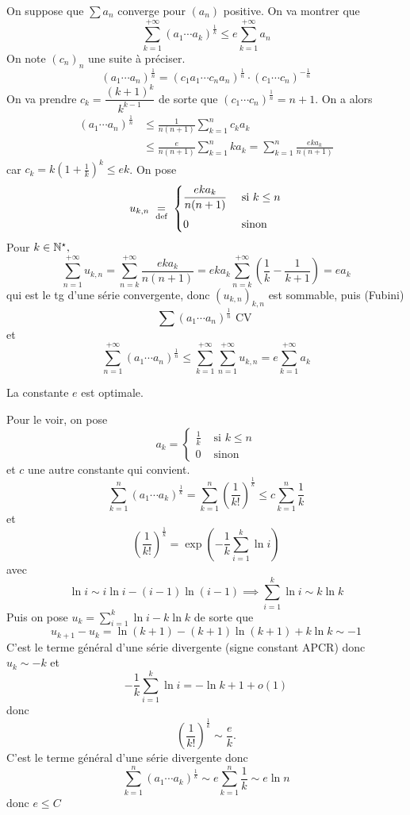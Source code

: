 On suppose que $\sum a_n$ converge pour $(a_n)$ positive. On va montrer que \[
    \sum_{k=1}^{+\infty}(a_1\cdots a_k)^{\frac1k}\leq e\sum_{k=1}^{+\infty}a_n
\]
On note $(c_n)_n$ une suite à préciser. \[
    (a_1\cdots a_n)^{\frac1n}=(c_1a_1\cdots c_na_n)^{\frac1n}\cdot (c_1\cdots c_n)^{-\frac1n}
\]
On va prendre $c_k=\dfrac{(k+1)^k}{k^{k-1}}$ de sorte que $(c_1\cdots c_n)^{\frac1n}=n+1$. On a alors \begin{align*}
    (a_1\cdots a_n)^{\frac 1n}&\leq \frac1{n(n+1)}\sum_{k=1}^nc_ka_k \tag{AM-GM}\\
                              &\leq \frac e{n(n+1)}\sum_{k=1}^nka_k=\sum_{k=1}^n\frac{eka_k}{n(n+1)}
\end{align*}
car $c_k=k \left( 1+\frac1k \right)^k\leq ek $. On pose \[
    u_{k, n}\;\underset{\text{def}}=\; \begin{cases}
        \dfrac{eka_k}{n(n+1)}&\text{ si }k\leq n\\[1em] 0 & \text{ sinon }
    \end{cases}
\]
Pour $k\in\mathbb N^\star,$ \[
    \sum_{n=1}^{+\infty}u_{k, n}=\sum_{n=k}^{+\infty}\frac{eka_k}{n(n+1)}=eka_k\sum_{n=k}^{+\infty} \left( \frac1k-\frac1{k+1} \right)=ea_k
\]
qui est le tg d'une série convergente, donc $(u_{k, n})_{k, n}$ est sommable, puis (Fubini) \[
    \sum (a_1\cdots a_n)^{\frac1n} \text{ CV }
\]
et \[
    \sum_{n=1}^{+\infty}(a_1\cdots a_n)^{\frac1n}\leq \sum_{k=1}^{+\infty}\sum_{n=1}^{+\infty}u_{k,n}=e\sum_{k=1}^{+\infty}a_k
\]

\begin{rem}
    La constante $e$ est optimale.
\end{rem}

Pour le voir, on pose \[
    a_k= \begin{cases}
        \frac1k&\text{ si }k\leq n\\ 0&\text{ sinon }
    \end{cases}
\]
et $c$ une autre constante qui convient. \[
    \sum_{k=1}^n(a_1\cdots a_k)^{\frac 1k}=\sum_{k=1}^n \left( \frac1{k!} \right)^{\frac1k}\leq c\sum_{k=1}^n\frac1k
\]
et \[
    \left( \frac1{k!} \right)^{\frac1k}=\exp \left( -\frac1k\sum_{i=1}^k\ln i \right)
\]
avec \[
    \ln i\sim i\ln i-(i-1)\ln (i-1) \implies \sum_{i=1}^k\ln i\sim k\ln k
\]
Puis on pose $\displaystyle u_k=\sum_{i=1}^k\ln i-k\ln k$ de sorte que \[
    u_{k+1}-u_k=\ln(k+1)-(k+1)\ln(k+1)+k\ln k\sim -1
\]
C'est le terme général d'une série divergente (signe constant APCR) donc $u_k\sim -k$ et \[
    -\frac1k\sum_{i=1}^k\ln i=-\ln k+1+o(1)
\]
donc \[
    \left( \frac1{k!} \right)^{\frac1k}\sim \frac ek.
\]
C'est le terme général d'une série divergente donc \[
    \sum_{k=1}^n (a_1\cdots a_k)^{\frac1k}\sim e\sum_{k=1}^n\frac1k\sim e\ln n
\]
donc $e\leq C$

